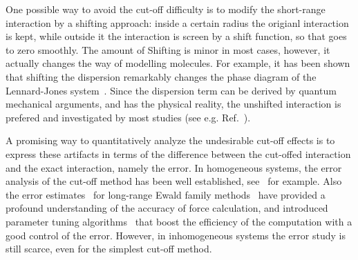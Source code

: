 \documentclass[preprint]{revtex4}
\newcommand{\recheck}[1]{{\color{red} #1}}
\begin{document}
\recheck{ One possible way to avoid the cut-off difficulty is to
  modify the short-range interaction by a shifting approach: inside a
  certain radius the origianl interaction is kept, while outside it the
  interaction is screen by a shift function, so that goes to
  zero smoothly. The amount of Shifting is minor in most cases,
  however, it actually changes the way of
  modelling molecules. For example, it
  has been shown that shifting the dispersion remarkably changes the
  phase diagram of the Lennard-Jones system~\cite{smit1992phase}.
  Since the dispersion term 
  can be derived by quantum mechanical arguments, and has the physical
  reality, the unshifted interaction is
  prefered and investigated by most studies
  (see e.g. Ref.~\cite{potoff1998critical, perez2006critical, wang2010optimizing}).
}


A promising way to quantitatively analyze the undesirable cut-off
effects is to express these artifacts in terms of the difference
between the cut-offed interaction and the exact interaction, namely
the error. In homogeneous systems, the error analysis of the cut-off
method has been well established, see~\cite{kolafa1992cutoff, wang2011} for
example. Also the error estimates~\cite{hummer1995numerical,
  kolafa1992cutoff, petersen1995accuracy, deserno1998mue2,
  wang2010optimizing} for long-range Ewald family
methods~\cite{ewald1921die, hockney1988computer, 
  darden1993pme, essmann1995spm, deserno1998mue1} have provided a profound
understanding of the accuracy of force calculation, and introduced
parameter tuning algorithms~\cite{limbach06a, wang2010optimizing} that
boost the efficiency of the computation with a good control of the
error. However, in inhomogeneous systems the error study is still
scarce, even for the simplest cut-off method.
\end{document}
